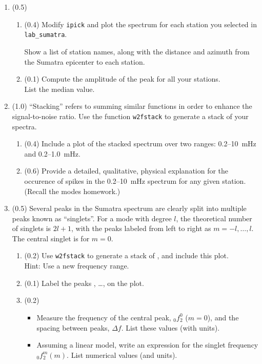 \documentclass[11pt,titlepage,fleqn]{article}
\begin{document}
\begin{enumerate}

\item (0.5)
%
\begin{enumerate}
\item (0.4) Modify \verb+ipick+ and plot the spectrum for each station you selected in \verb+lab_sumatra+.

Show a list of station names, along with the distance and azimuth from the Sumatra epicenter to each station.

\item (0.1) Compute the amplitude of the  peak for all your stations. \\
List the median value.
\end{enumerate}


\item (1.0) ``Stacking'' refers to summing similar functions in order to enhance the signal-to-noise ratio. Use the function \verb+w2fstack+ to generate a stack of your spectra.
%
\begin{enumerate}
\item (0.4) Include a plot of the stacked spectrum over two ranges: 0.2--10~mHz and 0.2--1.0~mHz.
\item (0.6) Provide a detailed, qualitative, physical explanation for the occurence of spikes in the 0.2--10~mHz spectrum for any given station. (Recall the modes homework.)
\end{enumerate}
%


\item (0.5) Several peaks in the Sumatra spectrum are clearly split into multiple peaks known as ``singlets''. For a mode with degree $l$, the theoretical number of singlets is $2l+1$, with the peaks labeled from left to right as $m = -l,\ldots,l$. The central singlet is for $m=0$.
%
\begin{enumerate}
\item (0.2) Use \verb+w2fstack+ to generate a stack of , and include this plot. \\
Hint: Use a new frequency range.
\item (0.1) Label the peaks , \ldots,  on the plot.
\item (0.2) 
\begin{itemize}
\item Measure the frequency of the central peak, $_0f_2^0$ ($m=0$), and the spacing between peaks, $\Delta f$. List these values (with units).
\item Assuming a linear model, write an expression for the singlet frequency $_0f_2^m(m)$. List numerical values (and units).
\end{itemize}
\end{enumerate}


\end{enumerate}
\end{document}
